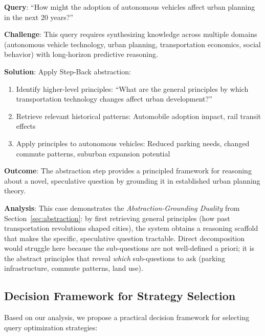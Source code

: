 \documentclass{article}
\begin{document}
\textbf{Query}: ``How might the adoption of autonomous vehicles affect urban planning in the next 20 years?''

\textbf{Challenge}: This query requires synthesizing knowledge across multiple domains (autonomous vehicle technology, urban planning, transportation economics, social behavior) with long-horizon predictive reasoning.

\textbf{Solution}: Apply Step-Back abstraction:
\begin{enumerate}[leftmargin=*,nosep]
    \item Identify higher-level principles: ``What are the general principles by which transportation technology changes affect urban development?''
    \item Retrieve relevant historical patterns: Automobile adoption impact, rail transit effects
    \item Apply principles to autonomous vehicles: Reduced parking needs, changed commute patterns, suburban expansion potential
\end{enumerate}

\textbf{Outcome}: The abstraction step provides a principled framework for reasoning about a novel, speculative question by grounding it in established urban planning theory.

\textbf{Analysis}: This case demonstrates the \textit{Abstraction-Grounding Duality} from Section~\ref{sec:abstraction}: by first retrieving general principles (how past transportation revolutions shaped cities), the system obtains a reasoning scaffold that makes the specific, speculative question tractable. Direct decomposition would struggle here because the sub-questions are not well-defined a priori; it is the abstract principles that reveal \textit{which} sub-questions to ask (parking infrastructure, commute patterns, land use).

\subsection{Decision Framework for Strategy Selection}

Based on our analysis, we propose a practical decision framework for selecting query optimization strategies:
\end{document}
